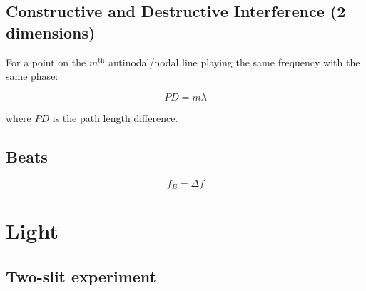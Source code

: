 \subsection{Constructive and Destructive Interference (2 dimensions)}

For a point on the $m^\text{th}$ antinodal/nodal line playing the same frequency with the same phase:

\[
	PD = m \lambda
\]

where $PD$ is the path length difference.

\subsection{Beats}

\[
	f_B = \Delta f
\]

\section{Light}

\subsection{Two-slit experiment}


